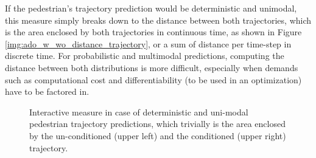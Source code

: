 If the pedestrian's trajectory prediction would be deterministic and unimodal, this measure simply breaks down to the distance between both trajectories, which is the area enclosed by both trajectories in continuous time, as shown in Figure \ref{img:ado_w_wo_distance_trajectory}, or a sum of distance per time-step in discrete time. For probabilistic and multimodal predictions, computing the distance between both distributions is more difficult, especially when demands such as computational cost and differentiability (to be used in an optimization) have to be factored in. 

\begin{figure}[!ht]
\begin{center}
\end{center}
\caption{Interactive measure in case of deterministic and uni-modal pedestrian trajectory predictions, which trivially is the area enclosed by the un-conditioned (upper left) and the conditioned (upper right) trajectory.}
\label{img:int_acceleration_reason}
\end{figure}


